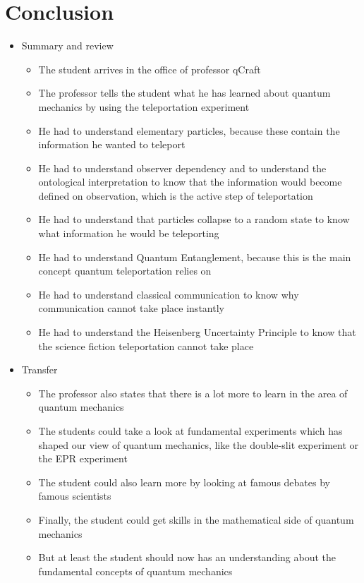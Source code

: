 \documentclass[11pt,twoside]{report} %
\begin{document}
\section{Conclusion}

\begin{itemize}
	\item Summary and review
	\begin{itemize}
		\item The student arrives in the office of professor qCraft
		\item The professor tells the student what he has learned about quantum mechanics by using the teleportation experiment
		\item He had to understand elementary particles, because these contain the information he wanted to teleport
		\item He had to understand observer dependency and to understand the ontological interpretation to know that the information would become defined on observation, which is the active step of teleportation
		\item He had to understand that particles collapse to a random state to know what information he would be teleporting
		\item He had to understand Quantum Entanglement, because this is the main concept quantum teleportation relies on
		\item He had to understand classical communication to know why communication cannot take place instantly
		\item He had to understand the Heisenberg Uncertainty Principle to know that the science fiction teleportation cannot take place
	\end{itemize}
	\item Transfer
	\begin{itemize}
		\item The professor also states that there is a lot more to learn in the area of quantum mechanics
		\item The students could take a look at fundamental experiments which has shaped our view of quantum mechanics, like the double-slit experiment or the EPR experiment
		\item The student could also learn more by looking at famous debates by famous scientists
		\item Finally, the student could get skills in the mathematical side of quantum mechanics
		\item But at least the student should now has an understanding about the fundamental concepts of quantum mechanics

\end{itemize}
\end{itemize}
\end{document}
